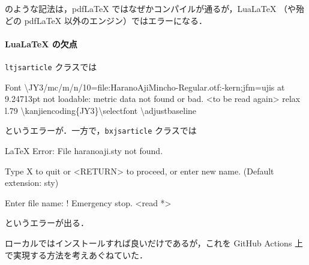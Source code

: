 \documentclass[
]{ltjsarticle}
\newenvironment{Shaded}{\begin{snugshade}}{\end{snugshade}}
\newcommand{\DataTypeTok}[1]{\textcolor[rgb]{0.68,0.00,0.00}{#1}}
\newcommand{\ExtensionTok}[1]{\textcolor[rgb]{0.00,0.23,0.31}{#1}}
\newcommand{\KeywordTok}[1]{\textcolor[rgb]{0.00,0.23,0.31}{#1}}
\newcommand{\NormalTok}[1]{\textcolor[rgb]{0.00,0.23,0.31}{#1}}
\newcommand{\OperatorTok}[1]{\textcolor[rgb]{0.37,0.37,0.37}{#1}}
\newcommand{\StringTok}[1]{\textcolor[rgb]{0.13,0.47,0.30}{#1}}
\newcommand{\VariableTok}[1]{\textcolor[rgb]{0.07,0.07,0.07}{#1}}
\begin{document}
のような記法は，pdfLaTeX ではなぜかコンパイルが通るが，LuaLaTeX
（や殆どの pdfLaTeX 以外のエンジン）ではエラーになる．

\paragraph{LuaLaTeX の欠点}\label{lualatex-ux306eux6b20ux70b9}

\texttt{ltjsarticle} クラスでは

\begin{Shaded}
\begin{Highlighting}[]
\ExtensionTok{Font} \DataTypeTok{\textbackslash{}J}\NormalTok{Y3/mc/m/n/10=file:HaranoAjiMincho{-}Regular.otf:{-}kern}\KeywordTok{;}\VariableTok{jfm}\OperatorTok{=}\NormalTok{ujis }\ExtensionTok{at}\NormalTok{ 9.24713pt not loadable: metric data not found or bad.}
\OperatorTok{\textless{}}\NormalTok{to }\ExtensionTok{be}\NormalTok{ read again}\OperatorTok{\textgreater{}} 
\ExtensionTok{relax} 
\ExtensionTok{l.79} \DataTypeTok{\textbackslash{}k}\NormalTok{anjiencoding\{JY3\}}\DataTypeTok{\textbackslash{}s}\NormalTok{electfont}
                                 \ExtensionTok{\textbackslash{}adjustbaseline}
\end{Highlighting}
\end{Shaded}

というエラーが．一方で，\texttt{bxjsarticle} クラスでは

\begin{Shaded}
\begin{Highlighting}[]
\ExtensionTok{LaTeX}\NormalTok{ Error: File }\KeywordTok{\textasciigrave{}}\ExtensionTok{haranoaji.sty}\StringTok{\textquotesingle{} not found.}

\StringTok{Type X to quit or \textless{}RETURN\textgreater{} to proceed,}
\StringTok{or enter new name. (Default extension: sty)}

\StringTok{Enter file name: }
\StringTok{! Emergency stop.}
\StringTok{\textless{}read *\textgreater{}}
\end{Highlighting}
\end{Shaded}

というエラーが出る．

ローカルではインストールすれば良いだけであるが，これを GitHub Actions
上で実現する方法を考えあぐねていた．
\end{document}
